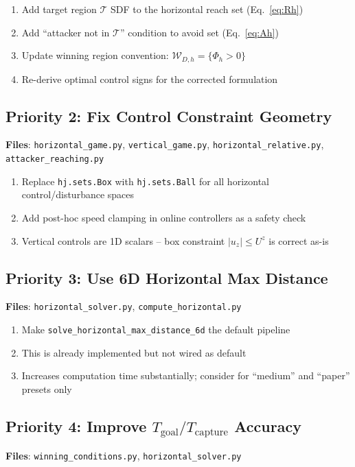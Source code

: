 \documentclass[11pt,a4paper]{article}
\begin{document}
\begin{enumerate}[nosep]
\item Add target region $\mathcal{T}$ SDF to the horizontal reach set (Eq.~\ref{eq:Rh})
\item Add ``attacker not in $\mathcal{T}$'' condition to avoid set (Eq.~\ref{eq:Ah})
\item Update winning region convention: $\mathcal{W}_{D,h} = \{\Phi_h > 0\}$
\item Re-derive optimal control signs for the corrected formulation
\end{enumerate}

\subsection{Priority 2: Fix Control Constraint Geometry}
\textbf{Files}: \texttt{horizontal\_game.py}, \texttt{vertical\_game.py}, \texttt{horizontal\_relative.py}, \texttt{attacker\_reaching.py}

\begin{enumerate}[nosep]
\item Replace \texttt{hj.sets.Box} with \texttt{hj.sets.Ball} for all horizontal control/disturbance spaces
\item Add post-hoc speed clamping in online controllers as a safety check
\item Vertical controls are 1D scalars -- box constraint $|u_z| \leq U^z$ is correct as-is
\end{enumerate}

\subsection{Priority 3: Use 6D Horizontal Max Distance}
\textbf{Files}: \texttt{horizontal\_solver.py}, \texttt{compute\_horizontal.py}

\begin{enumerate}[nosep]
\item Make \texttt{solve\_horizontal\_max\_distance\_6d} the default pipeline
\item This is already implemented but not wired as default
\item Increases computation time substantially; consider for ``medium'' and ``paper'' presets only
\end{enumerate}

\subsection{Priority 4: Improve $T_{\mathrm{goal}}/T_{\mathrm{capture}}$ Accuracy}
\textbf{Files}: \texttt{winning\_conditions.py}, \texttt{horizontal\_solver.py}
\end{document}
